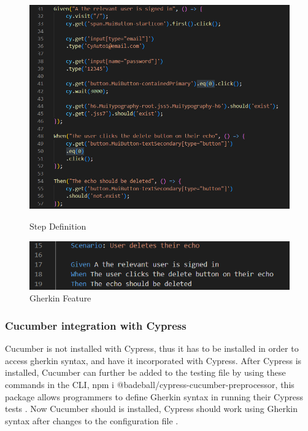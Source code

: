 \begin{figure}[ht]
\begin{minipage}[b]{0.5\linewidth}
    \centering
    \includegraphics[width=\linewidth]{images/StepDefination}
    \caption{Step Definition}
    \label{image:StepDefination}
\end{minipage}
    \hspace{0.5cm}
    \begin{minipage}[b]{0.5\linewidth}
    \centering
   \includegraphics[width=\linewidth]{images/Feature}
    \caption{Gherkin Feature}
    \label{image:Feature}
\end{minipage}
\end{figure}

\newpage
\subsubsection{Cucumber integration with Cypress}
Cucumber is not installed with Cypress, thus it has to be installed in order to access gherkin syntax, and have it incorporated with Cypress. After Cypress is installed, Cucumber can further be added to the testing file by using these commands in the CLI, npm i @badeball/cypress-cucumber-preprocessor, this package allows programmers to define Gherkin syntax in running their Cypress tests \cite{cypress-cucumber-preprocessor}\cite{CypressPlugins}. Now Cucumber should is installed, Cypress should work using Gherkin syntax after changes to the configuration file \cite{IntergratingCucumber}.

